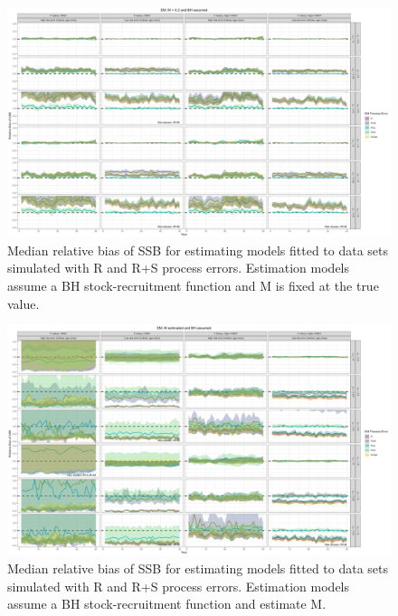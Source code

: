 \documentclass[
  12pt,
]{article}
\begin{document}
\begin{landscape}
\begin{figure}
\caption{Median relative bias of SSB for estimating models fitted to data sets simulated with R and R+S process errors. Estimation models assume a BH stock-recruitment function and M is fixed at the true value.}\label{naa_om_em_BH_MF_relbias_ssb}
\begin{center}
\includegraphics[width = \textwidth]{naa_om_BH_MF_relbias_ssb.png}
\end{center}
\end{figure}
\end{landscape}

\begin{landscape}
\begin{figure}
\caption{Median relative bias of SSB for estimating models fitted to data sets simulated with R and R+S process errors. Estimation models assume a BH stock-recruitment function and estimate M.}\label{naa_om_em_BH_ME_relbias_ssb}
\begin{center}
\includegraphics[width = \textwidth]{naa_om_BH_ME_relbias_ssb.png}
\end{center}
\end{figure}
\end{landscape}
\end{document}
